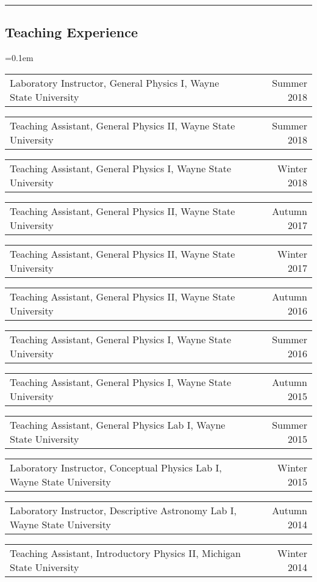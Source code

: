 \documentclass[10pt,letterpaper]{article}
\makeatletter
\newcommand{\headerrow}[2]
{\begin{tabular*}{\linewidth}{l@{\extracolsep{\fill}}r}
	#1 &
	#2 \\
\end{tabular*}}
\makeatother
\begin{document}
\hrule
\vspace{-0.4em}
\subsection*{Teaching Experience}

\begin{itemize*}
	\parskip=0.1em
	\item[]
	\headerrow
		{Laboratory Instructor, General Physics I, Wayne State University}
		{Summer 2018}

	\item[]
	\headerrow
		{Teaching Assistant, General Physics II, Wayne State University}
		{Summer 2018}

	\item[]
	\headerrow
		{Teaching Assistant, General Physics I, Wayne State University}
		{Winter 2018}

	\item[]
	\headerrow
		{Teaching Assistant, General Physics II, Wayne State University}
		{Autumn 2017}

	\item[]
	\headerrow
		{Teaching Assistant, General Physics II, Wayne State University}
		{Winter 2017}

	\item[]
	\headerrow
		{Teaching Assistant, General Physics II, Wayne State University}
		{Autumn 2016}

	\item[]
	\headerrow
		{Teaching Assistant, General Physics I, Wayne State University}
		{Summer 2016}

	\item[]
	\headerrow
		{Teaching Assistant, General Physics I, Wayne State University}
		{Autumn 2015}
	
	\item[]
	\headerrow
		{Teaching Assistant, General Physics Lab I, Wayne State University}
		{Summer 2015}

	\item[]
	\headerrow
		{Laboratory Instructor, Conceptual Physics Lab I, Wayne State University}
		{Winter 2015}

	\item[]
	\headerrow
		{Laboratory Instructor, Descriptive Astronomy Lab I, Wayne State University}
		{Autumn 2014}

	\item[]
	\headerrow
		{Teaching Assistant, Introductory Physics II, Michigan State University}
		{Winter 2014}


\end{itemize*}
\end{document}
